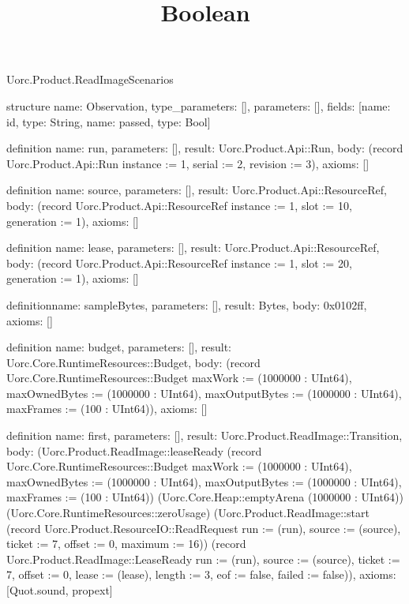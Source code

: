 \begin{lexlean}{Uorc.Product.ReadImageScenarios}
\title{Boolean}
\begin{semanticmodule}
structure{
  name: Observation,
  type_parameters: [],
  parameters: [],
  fields: [{name: id, type: String}, {name: passed, type: Bool}]
}

definition{
  name: run,
  parameters: [],
  result: Uorc.Product.Api::Run,
  body: (record Uorc.Product.Api::Run {instance := 1, serial := 2, revision := 3}),
  axioms: []
}

definition{
  name: source,
  parameters: [],
  result: Uorc.Product.Api::ResourceRef,
  body: (record Uorc.Product.Api::ResourceRef {instance := 1, slot := 10, generation := 1}),
  axioms: []
}

definition{
  name: lease,
  parameters: [],
  result: Uorc.Product.Api::ResourceRef,
  body: (record Uorc.Product.Api::ResourceRef {instance := 1, slot := 20, generation := 1}),
  axioms: []
}

definition{name: sampleBytes, parameters: [], result: Bytes, body: 0x0102ff, axioms: []}

definition{
  name: budget,
  parameters: [],
  result: Uorc.Core.RuntimeResources::Budget,
  body: (record Uorc.Core.RuntimeResources::Budget {maxWork := (1000000 : UInt64), maxOwnedBytes := (1000000 : UInt64), maxOutputBytes := (1000000 : UInt64), maxFrames := (100 : UInt64)}),
  axioms: []
}

definition{
  name: first,
  parameters: [],
  result: Uorc.Product.ReadImage::Transition,
  body: (Uorc.Product.ReadImage::leaseReady (record Uorc.Core.RuntimeResources::Budget {maxWork := (1000000 : UInt64), maxOwnedBytes := (1000000 : UInt64), maxOutputBytes := (1000000 : UInt64), maxFrames := (100 : UInt64)}) (Uorc.Core.Heap::emptyArena (1000000 : UInt64)) (Uorc.Core.RuntimeResources::zeroUsage) (Uorc.Product.ReadImage::start (record Uorc.Product.ResourceIO::ReadRequest {run := (run), source := (source), ticket := 7, offset := 0, maximum := 16})) (record Uorc.Product.ReadImage::LeaseReady {run := (run), source := (source), ticket := 7, offset := 0, lease := (lease), length := 3, eof := false, failed := false})),
  axioms: [Quot.sound, propext]
}


\end{semanticmodule}
\end{lexlean}
